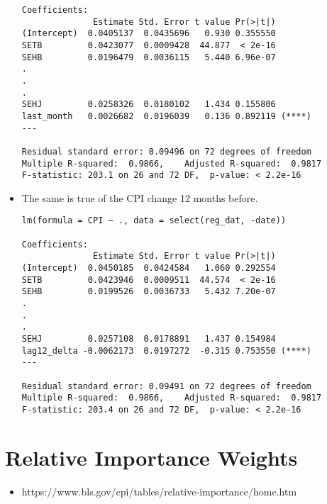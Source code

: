 \documentclass{article}
\begin{document}
\begin{itemize}
\begin{verbatim}
Coefficients:
              Estimate Std. Error t value Pr(>|t|)    
(Intercept)  0.0405137  0.0435696   0.930 0.355550    
SETB         0.0423077  0.0009428  44.877  < 2e-16 
SEHB         0.0196479  0.0036115   5.440 6.96e-07
.
.
.
SEHJ         0.0258326  0.0180102   1.434 0.155806    
last_month   0.0026682  0.0196039   0.136 0.892119 (****)
---

Residual standard error: 0.09496 on 72 degrees of freedom
Multiple R-squared:  0.9866,	Adjusted R-squared:  0.9817 
F-statistic: 203.1 on 26 and 72 DF,  p-value: < 2.2e-16
\end{verbatim}

\item The same is true of the CPI change 12 months before.
\begin{verbatim}
lm(formula = CPI ~ ., data = select(reg_dat, -date))

Coefficients:
              Estimate Std. Error t value Pr(>|t|)    
(Intercept)  0.0450185  0.0424584   1.060 0.292554    
SETB         0.0423946  0.0009511  44.574  < 2e-16 
SEHB         0.0199526  0.0036733   5.432 7.20e-07
.
.
.
SEHJ         0.0257108  0.0178891   1.437 0.154984    
lag12_delta -0.0062173  0.0197272  -0.315 0.753550 (****)
---

Residual standard error: 0.09491 on 72 degrees of freedom
Multiple R-squared:  0.9866,	Adjusted R-squared:  0.9817 
F-statistic: 203.4 on 26 and 72 DF,  p-value: < 2.2e-16
\end{verbatim}
\end{itemize}
\section*{Relative Importance Weights}
\begin{itemize}
\item https://www.bls.gov/cpi/tables/relative-importance/home.htm
\end{itemize}
\end{document}
